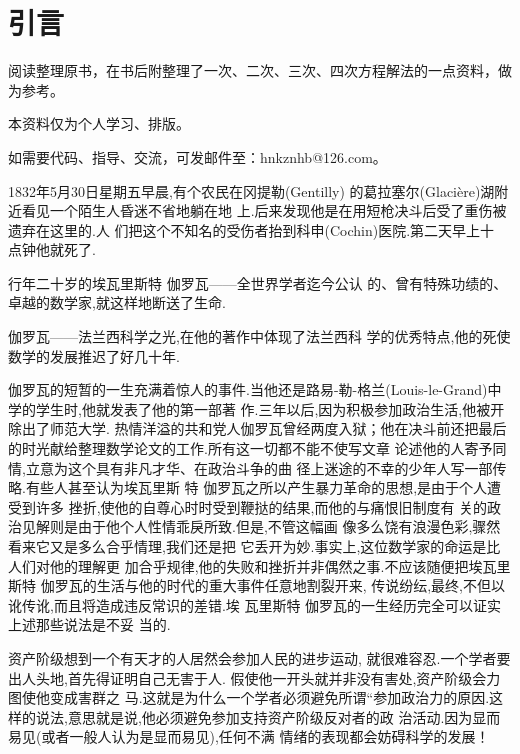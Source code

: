 \chapter*{引言}



\begin{note}
	
	阅读整理原书，在书后附整理了一次、二次、三次、四次方程解法的一点资料，做为参考。
	
	本资料仅为个人学习、排版。
	
	如需要代码、指导、交流，可发邮件至：hnkznhb@126.com。
\end{note}

\par

1832年5月30日星期五早晨,有个农民在冈提勒(Gentilly) 的葛拉塞尔(Glacière)湖附近看见一个陌生人昏迷不省地躺在地 上.后来发现他是在用短枪决斗后受了重伤被遗弃在这里的.人 们把这个不知名的受伤者抬到科申(Cochin)医院.第二天早上十 点钟他就死了.

行年二十岁的埃瓦里斯特 \textbullet 伽罗瓦——全世界学者迄今公认 的、曾有特殊功绩的、卓越的数学家,就这样地断送了生命.

伽罗瓦——法兰西科学之光,在他的著作中体现了法兰西科 学的优秀特点,他的死使数学的发展推迟了好几十年.

伽罗瓦的短暂的一生充满着惊人的事件.当他还是路易-勒-格兰(Louis-le-Grand)中学的学生时,他就发表了他的第一部著 作.三年以后,因为积极参加政治生活,他被开除出了师范大学. 热情洋溢的共和党人伽罗瓦曾经两度入狱；他在决斗前还把最后 的时光献给整理数学论文的工作.所有这一切都不能不使写文章 论述他的人寄予同情,立意为这个具有非凡才华、在政治斗争的曲 径上迷途的不幸的少年人写一部传略.有些人甚至认为埃瓦里斯 特 \textbullet 伽罗瓦之所以产生暴力革命的思想,是由于个人遭受到许多 挫折,使他的自尊心时时受到鞭挞的结果,而他的与痛恨旧制度有 关的政治见解则是由于他个人性情乖戾所致.但是,不管这幅画 像多么饶有浪漫色彩,骤然看来它又是多么合乎情理,我们还是把 它丢开为妙.事实上,这位数学家的命运是比人们对他的理解更 加合乎规律,他的失败和挫折并非偶然之事.不应该随便把埃瓦里斯特 \textbullet 伽罗瓦的生活与他的时代的重大事件任意地割裂开来, 传说纷纭,最终,不但以讹传讹,而且将造成违反常识的差错.埃 瓦里斯特 \textbullet 伽罗瓦的一生经历完全可以证实上述那些说法是不妥 当的.

资产阶级想到一个有天才的人居然会参加人民的进步运动, 就很难容忍.一个学者要出人头地,首先得证明自己无害于人. 假使他一开头就并非没有害处,资产阶级会力图使他变成害群之 马.这就是为什么一个学者必须避免所谓“参加政治力的原因.这样的说法,意思就是说,他必须避免参加支持资产阶级反对者的政 治活动.因为显而易见(或者一般人认为是显而易见),任何不满 情绪的表现都会妨碍科学的发展！

